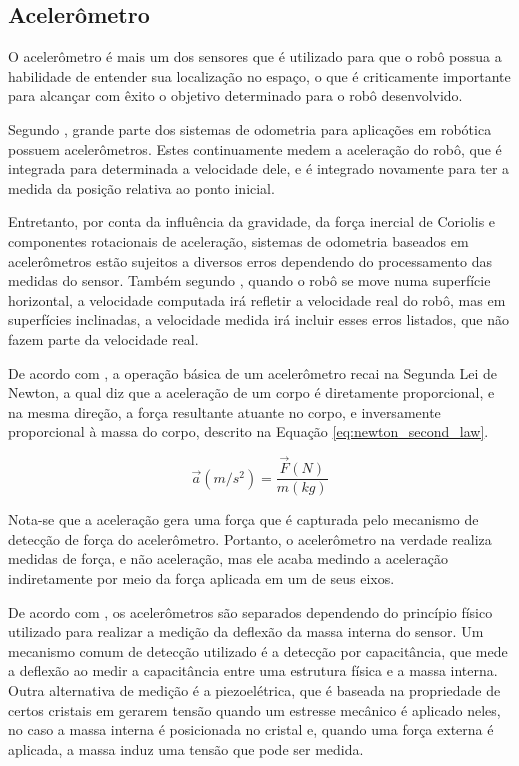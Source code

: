 \documentclass[acronym, symbols, table]{fei}
\begin{document}
			\subsection{Acelerômetro} \label{sec:sensores_acelerometro}
			
				O acelerômetro é mais um dos sensores que é utilizado para que o robô possua a habilidade de entender sua localização no espaço, o que é criticamente importante para alcançar com êxito o objetivo determinado para o robô desenvolvido.
			
				Segundo \textcite{NISTLER2011413}, grande parte dos sistemas de odometria para aplicações em robótica possuem acelerômetros. Estes continuamente medem a aceleração do robô, que é integrada para determinada a velocidade dele, e é integrado novamente para ter a medida da posição relativa ao ponto inicial.
				
				Entretanto, por conta da influência da gravidade, da força inercial de Coriolis \cite{persson1998we} e componentes rotacionais de aceleração, sistemas de odometria baseados em acelerômetros estão sujeitos a diversos erros dependendo do processamento das medidas do sensor. Também segundo \textcite{NISTLER2011413}, quando o robô se move numa superfície horizontal, a velocidade computada irá refletir a velocidade real do robô, mas em superfícies inclinadas, a velocidade medida irá incluir esses erros listados, que não fazem parte da velocidade real.
			
				De acordo com \textcite{dadafshar2014accelerometer}, a operação básica de um acelerômetro recai na Segunda Lei de Newton, a qual diz que a aceleração de um corpo é diretamente proporcional, e na mesma direção, a força resultante atuante no corpo, e inversamente proporcional à massa do corpo, descrito na Equação \eqref{eq:newton_second_law}.
				
				\begin{equation}\label{eq:newton_second_law}
					\overrightarrow{a}(m/s^2) = \frac{\overrightarrow{F}(N)}{m(kg)}
				\end{equation}
			
				Nota-se que a aceleração gera uma força que é capturada pelo mecanismo de detecção de força do acelerômetro. Portanto, o acelerômetro na verdade realiza medidas de força, e não aceleração, mas ele acaba medindo a aceleração indiretamente por meio da força aplicada em um de seus eixos.
				
				De acordo com \textcite{siegwart2011introduction}, os acelerômetros são separados dependendo do princípio físico utilizado para realizar a medição da deflexão da massa interna do sensor. Um mecanismo comum de detecção utilizado é a detecção por capacitância, que mede a deflexão ao medir a capacitância entre uma estrutura física e a massa interna. Outra alternativa de medição é a piezoelétrica, que é baseada na propriedade de certos cristais em gerarem tensão quando um estresse mecânico é aplicado neles, no caso a massa interna é posicionada no cristal e, quando uma força externa é aplicada, a massa induz uma tensão que pode ser medida.
				
\end{document}
